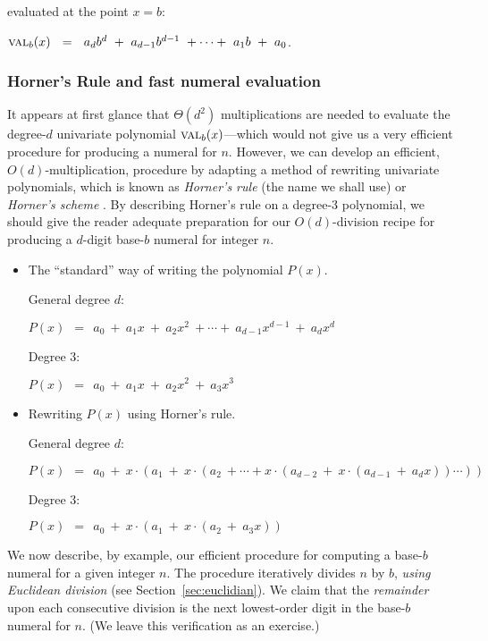 \noindent
evaluated at the point $x=b$:

$\mbox{\sc val}_{b}(x) \ \ = \ \ a_d b^d \ + \ a_{d-1} b^{d-1} \ +
\cdots + \ a_1 b \ + \ a_0$.

\subsubsection{Horner's Rule and fast numeral evaluation}

It appears at first glance that $\Theta(d^2)$ multiplications are
needed to evaluate the degree-$d$ univariate polynomial $\mbox{\sc
  val}_{b}(x)$---which would not give us a very efficient procedure
for producing a numeral for $n$.  However, we can develop an
efficient, $O(d)$-multiplication, procedure by adapting a method of
rewriting univariate polynomials, which is known as {\it Horner's
  rule} (the name we shall use) or {\it Horner's scheme}
\cite{Horner}.  
  By
describing Horner's rule on a degree-$3$ polynomial, we should give
the reader adequate preparation for our $O(d)$-division recipe for
producing a $d$-digit base-$b$ numeral for integer $n$.

\medskip

\begin{itemize}
\item {\small\sf The ``standard'' way of writing the polynomial $P(x)$.}

\noindent General degree $d$:

$P(x) \ \ = \ \ a_0 \ + \ a_1 x \ + \ a_2 x^2 \ + \cdots + \ a_{d-1}
x^{d-1} \ + \ a_d x^d$

\noindent Degree $3$:

$P(x) \ \ = \ \ a_0 \ + \ a_1 x \ + \ a_2 x^2 \ + \ a_3 x^3$

\item {\small\sf Rewriting $P(x)$ using Horner's rule.}

\noindent General degree $d$:

$P(x) \ \ = \ \ a_0 \ + \ x \cdot (a_1 \ + \ x \cdot (a_2  \ +  \cdots
+ x \cdot (a_{d-2} \ + \ x \cdot (a_{d-1} \ + \ a_d x)) \cdots ))$  

\noindent Degree $3$:

$P(x) \ \ = \ \ a_0 \ + \ x \cdot (a_1 \ + \ x \cdot (a_2  \ + \ a_3 x))$ 
\end{itemize}

\noindent
We now describe, by example, our efficient procedure for computing a
base-$b$ numeral for a given integer $n$.  The procedure iteratively
divides $n$ by $b$, {\em using Euclidean division} (see
Section~\ref{sec:euclidian}).  We claim that the {\em remainder} upon
each consecutive division is the next lowest-order digit in the
base-$b$ numeral for $n$.  (We leave this verification as an
exercise.)

